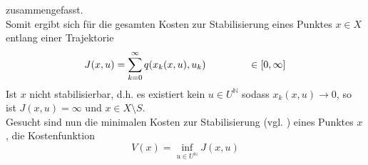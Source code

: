 \documentclass[12pt,a4paper,twoside]{article}
\begin{document}
	zusammengefasst. \\
	Somit ergibt sich für die gesamten Kosten zur Stabilisierung eines Punktes $x\in X$ entlang einer Trajektorie
	\begin{equation}
		J(x,u)=\sum_{k=0}^{\infty}q(x_k(x,u),u_k) \hspace{1.5cm} \in [0,\infty]
	\end{equation}
	Ist $x$ nicht stabilisierbar, d.h. es existiert kein $u\in U^{\mathds{N}}$ sodass $x_k(x,u)\rightarrow 0$, so ist $J(x,u)=\infty$ und $x\in X\setminus S$. \\
	Gesucht sind nun die minimalen Kosten zur Stabilisierung (vgl. \cite{Junge2004}) eines Punktes $x$, die Kostenfunktion
	\begin{equation}
		\label{eq:valuefunction}
		V(x)=\inf_{u\in U^{\mathds{N}}}J(x,u)
	\end{equation}
\end{document}
